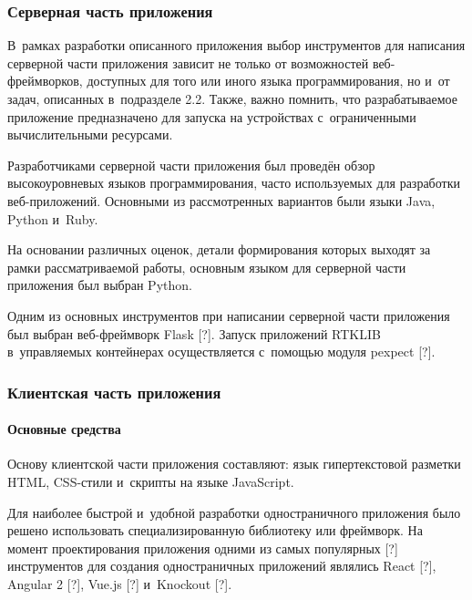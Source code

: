 \subsubsection{Серверная часть приложения}
\label{subsec:backend-tools}

В~рамках разработки описанного приложения выбор инструментов для написания серверной части приложения зависит не только от возможностей веб-фреймворков, доступных для того или иного языка программирования, но и~от задач, описанных в~подразделе 2.2. Также, важно помнить, что разрабатываемое приложение предназначено для запуска на устройствах с~ограниченными вычислительными ресурсами. \par

Разработчиками серверной части приложения был проведён обзор высокоуровневых языков программирования, часто используемых для разработки веб-приложений. Основными из рассмотренных вариантов были языки Java, Python и~Ruby. \par

На основании различных оценок, детали формирования которых выходят за рамки рассматриваемой работы, основным языком для серверной части приложения был выбран Python.

Одним из основных инструментов при написании серверной части приложения был выбран веб-фреймворк Flask [?]. Запуск приложений RTKLIB в~управляемых контейнерах осуществляется с~помощью модуля pexpect [?].

\subsubsection{Клиентская часть приложения}
\label{subsec:frontend-tools}

\paragraph{Основные средства}

Основу клиентской части приложения составляют: язык гипертекстовой разметки HTML, CSS-стили и~скрипты на языке JavaScript.

Для наиболее быстрой и~удобной разработки одностраничного приложения было решено использовать специализированную библиотеку или фреймворк. На момент проектирования приложения одними из самых популярных [?] инструментов для создания одностраничных приложений являлись React [?], Angular 2 [?], Vue.js [?] и~Knockout [?].


